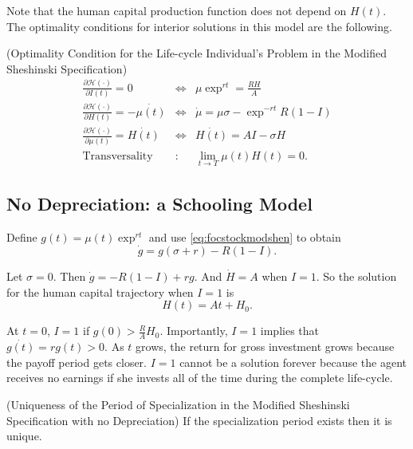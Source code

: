 \indent Note that the human capital production function does not depend on $H(t)$. The optimality conditions for interior solutions in this model are the following.
\begin{condition} (Optimality Condition for the Life-cycle Individual's Problem in the Modified Sheshinski Specification)
\begin{eqnarray}
\frac{\partial \mathcal{H} (\cdot)}{\partial I(t)} = 0 &\Leftrightarrow& \mu \exp^{rt} = \frac{RH}{A} \label{eq:focinvestmentmodsehn} \\
\frac{\partial \mathcal{H} (\cdot)}{\partial H(t)} = - \dot{\mu(t)} &\Leftrightarrow& \dot{\mu} = \mu \sigma - \exp^{-rt} R (1 - I) \label{eq:focstockmodshen} \\ 
\frac{\partial \mathcal{H} (\cdot)}{\partial \mu(t)} = \dot{H(t)} &\Leftrightarrow& \dot{H(t)} = AI - \sigma H \label{eq:focmotionmodshen} \\
\text{Transversality} &:& \lim_{t \rightarrow T} \mu(t) H(t) = 0. \label{eq:foctransversalitymodshen}
\end{eqnarray}
\end{condition}

\subsection{No Depreciation: a Schooling Model}
\indent Define $g(t) = \mu(t) \exp^{rt}$ and use \eqref{eq:focstockmodshen} to obtain
\begin{equation}
\dot{g} = g(\sigma + r) - R(1 - I). \label{eq:gmodshen}
\end{equation}

\noindent Let $\sigma = 0 $. Then $\dot{g} = -R(1 - I) + rg$. And $\dot{H} = A$ when $I=1$. So the solution for the human capital trajectory when $I = 1$ is
\begin{equation}
H(t) = At + H_{0} \label{eq:humancapshenmod}.
\end{equation} 

\noindent At $t = 0$, $I = 1$ if $g(0) > \frac{R}{A} H_{0}$. Importantly, $I = 1$ implies that $\dot{g(t)} = r g(t) > 0$. As $t$ grows, the return for gross investment grows because the payoff period gets closer. $I = 1$ cannot be a solution forever because the agent receives no earnings if she invests all of the time during the complete life-cycle.\\
\begin{claim} (Uniqueness of the Period of Specialization in the Modified Sheshinski Specification with no Depreciation)
If the specialization period exists then it is unique.
\end{claim}

